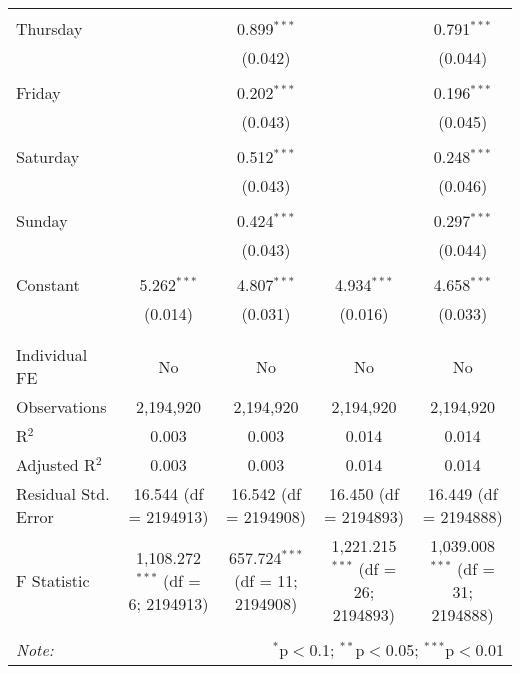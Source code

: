 \documentclass[
]{article}
\begin{document}
\begin{table}[!htbp]
{\begin{tabular}{@{\extracolsep{5pt}}lcccc}
  & & & & \\ 
 Thursday &  & 0.899$^{***}$ &  & 0.791$^{***}$ \\ 
  &  & (0.042) &  & (0.044) \\ 
  & & & & \\ 
 Friday &  & 0.202$^{***}$ &  & 0.196$^{***}$ \\ 
  &  & (0.043) &  & (0.045) \\ 
  & & & & \\ 
 Saturday &  & 0.512$^{***}$ &  & 0.248$^{***}$ \\ 
  &  & (0.043) &  & (0.046) \\ 
  & & & & \\ 
 Sunday &  & 0.424$^{***}$ &  & 0.297$^{***}$ \\ 
  &  & (0.043) &  & (0.044) \\ 
  & & & & \\ 
 Constant & 5.262$^{***}$ & 4.807$^{***}$ & 4.934$^{***}$ & 4.658$^{***}$ \\ 
  & (0.014) & (0.031) & (0.016) & (0.033) \\ 
  & & & & \\ 
\hline \\[-1.8ex] 
Individual FE & No & No & No & No \\ 
Observations & 2,194,920 & 2,194,920 & 2,194,920 & 2,194,920 \\ 
R$^{2}$ & 0.003 & 0.003 & 0.014 & 0.014 \\ 
Adjusted R$^{2}$ & 0.003 & 0.003 & 0.014 & 0.014 \\ 
Residual Std. Error & 16.544 (df = 2194913) & 16.542 (df = 2194908) & 16.450 (df = 2194893) & 16.449 (df = 2194888) \\ 
F Statistic & 1,108.272$^{***}$ (df = 6; 2194913) & 657.724$^{***}$ (df = 11; 2194908) & 1,221.215$^{***}$ (df = 26; 2194893) & 1,039.008$^{***}$ (df = 31; 2194888) \\ 
\hline 
\hline \\[-1.8ex] 
\textit{Note:}  & \multicolumn{4}{r}{$^{*}$p$<$0.1; $^{**}$p$<$0.05; $^{***}$p$<$0.01} \\ 
\end{tabular}
} 
\end{table} 
\newpage
\end{document}
